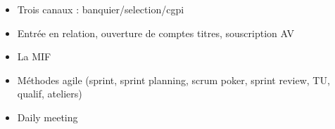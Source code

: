 \begin{itemize}
	\item Trois canaux : banquier/selection/cgpi
	\item Entrée en relation, ouverture de comptes titres, souscription AV
	\item La MIF
	\item Méthodes agile (sprint, sprint planning, scrum poker, sprint review, TU, qualif, ateliers)
	\item Daily meeting
\end{itemize}
